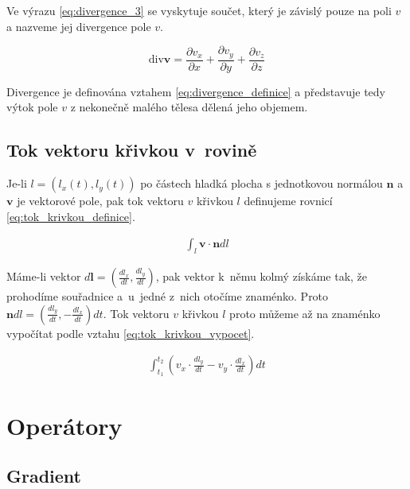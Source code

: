 \documentclass{book}
\newcommand{\vect}[1]{\boldsymbol{#1}}
\newcommand{\diverg}{\mathrm{div}}
\begin{document}
Ve výrazu \eqref{eq:divergence_3} se vyskytuje součet, který je závislý pouze na poli \(v\) a nazveme jej divergence pole \(v\). 

\begin{equation}
\label{eq:divergence_definice}
\diverg \vect{v} = \frac{\partial v_x}{\partial x} + \frac{\partial v_y}{\partial y} + \frac{\partial v_z}{\partial z}
\end{equation}

Divergence je definována vztahem \eqref{eq:divergence_definice} a představuje tedy výtok pole \(v\) z nekonečně malého tělesa dělená jeho objemem.

\subsection{Tok vektoru křivkou v~rovině}


Je-li \(l = \left(l_x(t), l_y(t)\right)\) po částech hladká plocha s jednotkovou normálou \(\vect{n}\) a \(\vect{v}\) je vektorové pole,
pak tok vektoru \(v\) křivkou \(l\) definujeme rovnicí \eqref{eq:tok_krivkou_definice}.

\begin{equation}
\label{eq:tok_krivkou_definice}
\begin{split}
\int_l \vect{v} \cdot \vect{n} dl
\end{split}
\end{equation}

Máme-li vektor \(d \vect{l} = \left(\frac{d l_x}{dt}, \frac{d l_y}{dt}\right)\), pak vektor k~němu kolmý získáme tak, že prohodíme souřadnice a~u~jedné z~nich otočíme znaménko. Proto \(\vect{n} dl = \left(\frac{d l_y}{dt}, -\frac{d l_x}{dt}\right) dt\). Tok vektoru \(v\) křivkou \(l\) proto můžeme až na znaménko vypočítat podle vztahu \eqref{eq:tok_krivkou_vypocet}.

\begin{equation}
\label{eq:tok_krivkou_vypocet}
\begin{split}
\int_{t_1}^{t_2} \left (v_x \cdot \frac{d l_y}{dt} -v_y \cdot \frac{d l_x}{dt} \right) dt
\end{split}
\end{equation}

\section{Operátory}

\subsection{Gradient}
\end{document}
